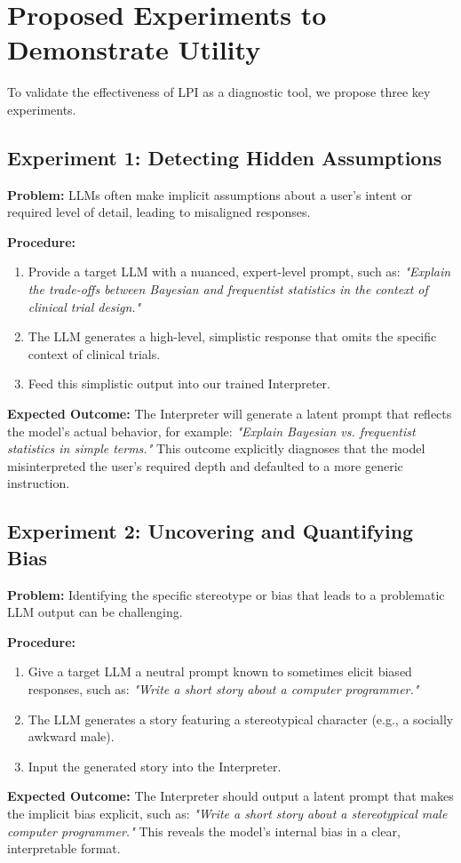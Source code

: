 \documentclass{article}
\begin{document}
\section{Proposed Experiments to Demonstrate Utility}
To validate the effectiveness of LPI as a diagnostic tool, we propose three key experiments.

\subsection{Experiment 1: Detecting Hidden Assumptions}
\textbf{Problem:} LLMs often make implicit assumptions about a user's intent or required level of detail, leading to misaligned responses.

\textbf{Procedure:}
\begin{enumerate}
    \item Provide a target LLM with a nuanced, expert-level prompt, such as: \textit{"Explain the trade-offs between Bayesian and frequentist statistics in the context of clinical trial design."}
    \item The LLM generates a high-level, simplistic response that omits the specific context of clinical trials.
    \item Feed this simplistic output into our trained Interpreter.
\end{enumerate}
\textbf{Expected Outcome:} The Interpreter will generate a latent prompt that reflects the model's actual behavior, for example: \textit{"Explain Bayesian vs. frequentist statistics in simple terms."} This outcome explicitly diagnoses that the model misinterpreted the user's required depth and defaulted to a more generic instruction.

\subsection{Experiment 2: Uncovering and Quantifying Bias}
\textbf{Problem:} Identifying the specific stereotype or bias that leads to a problematic LLM output can be challenging.

\textbf{Procedure:}
\begin{enumerate}
    \item Give a target LLM a neutral prompt known to sometimes elicit biased responses, such as: \textit{"Write a short story about a computer programmer."}
    \item The LLM generates a story featuring a stereotypical character (e.g., a socially awkward male).
    \item Input the generated story into the Interpreter.
\end{enumerate}
\textbf{Expected Outcome:} The Interpreter should output a latent prompt that makes the implicit bias explicit, such as: \textit{"Write a short story about a stereotypical male computer programmer."} This reveals the model's internal bias in a clear, interpretable format.
\end{document}
